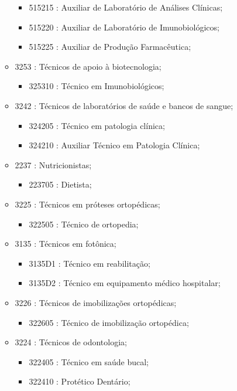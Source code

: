 \begin{itemize}
\begin{itemize}
\begin{itemize}
      \item 515215 : Auxiliar de Laboratório de Análises Clínicas;
      \item 515220 : Auxiliar de Laboratório de Imunobiológicos;
      \item 515225 : Auxiliar de Produção Farmacêutica;
    \end{itemize}
    \item 3253 : Técnicos de apoio à biotecnologia;
    \begin{itemize}
      \item 325310 : Técnico em Imunobiológicos;
    \end{itemize}
    \item 3242 : Técnicos de laboratórios de saúde e bancos de sangue;
    \begin{itemize}
      \item 324205 : Técnico em patologia clínica;
      \item 324210 : Auxiliar Técnico em Patologia Clínica;
    \end{itemize}
    \item 2237 : Nutricionistas;
    \begin{itemize}
      \item 223705 : Dietista;
    \end{itemize}
    \item 3225 : Técnicos em próteses ortopédicas;
    \begin{itemize}
      \item 322505 : Técnico de ortopedia;
    \end{itemize}
    \item 3135 : Técnicos em fotônica;
    \begin{itemize}
      \item 3135D1 : Técnico em reabilitação;
      \item 3135D2 : Técnico em equipamento médico hospitalar;
    \end{itemize}
    \item 3226 : Técnicos de imobilizações ortopédicas;
    \begin{itemize}
      \item 322605 : Técnico de imobilização ortopédica;
    \end{itemize}
    \item 3224 : Técnicos de odontologia;
    \begin{itemize}
      \item 322405 : Técnico em saúde bucal;
      \item 322410 : Protético Dentário;

\end{itemize}
\end{itemize}
\end{itemize}
